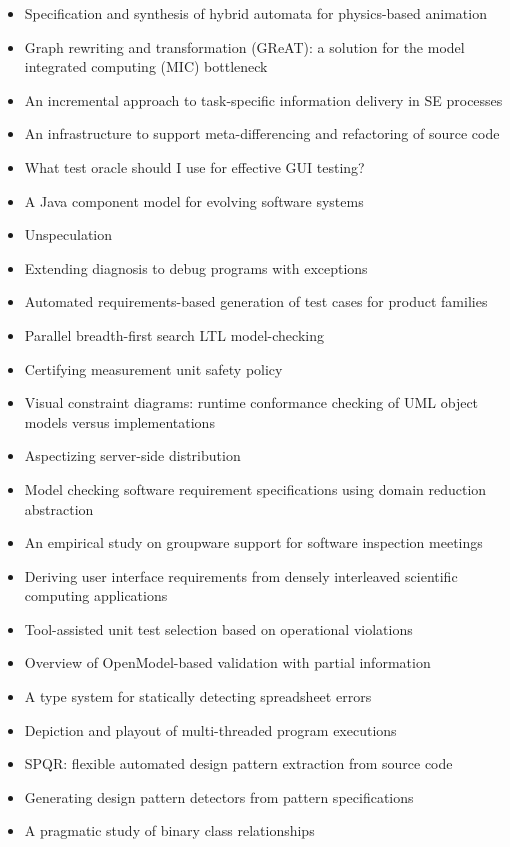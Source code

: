 {\begin{itemize}[itemsep=-1ex]
  \item Specification and synthesis of hybrid automata for physics-based animation
  \item Graph rewriting and transformation (GReAT): a solution for the model integrated computing (MIC) bottleneck
  \item An incremental approach to task-specific information delivery in SE processes
  \item An infrastructure to support meta-differencing and refactoring of source code
  \item What test oracle should I use for effective GUI testing?
  \item A Java component model for evolving software systems
  \item Unspeculation
  \item Extending diagnosis to debug programs with exceptions
  \item Automated requirements-based generation of test cases for product families
  \item Parallel breadth-first search LTL model-checking
  \item Certifying measurement unit safety policy
  \item Visual constraint diagrams: runtime conformance checking of UML object models versus implementations
  \item Aspectizing server-side distribution
  \item Model checking software requirement specifications using domain reduction abstraction
  \item An empirical study on groupware support for software inspection meetings
  \item Deriving user interface requirements from densely interleaved scientific computing applications
  \item Tool-assisted unit test selection based on operational violations
  \item Overview of OpenModel-based validation with partial information
  \item A type system for statically detecting spreadsheet errors
  \item Depiction and playout of multi-threaded program executions
  \item SPQR: flexible automated design pattern extraction from source code
  \item Generating design pattern detectors from pattern specifications
  \item A pragmatic study of binary class relationships

\end{itemize}}
